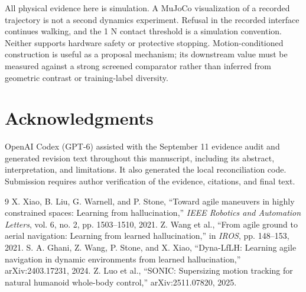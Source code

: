 \documentclass[letterpaper,10pt,conference]{ieeeconf}
\begin{document}
All physical evidence here is simulation. A MuJoCo visualization of a recorded
trajectory is not a second dynamics experiment. Refusal in the recorded interface
continues walking, and the 1 N contact threshold is a simulation convention.
Neither supports hardware safety or protective stopping. Motion-conditioned
construction is useful as a proposal mechanism; its downstream value must be
measured against a strong screened comparator rather than inferred from
geometric contrast or training-label diversity.

\section*{Acknowledgments}
OpenAI Codex (GPT-6) assisted with the September 11 evidence audit and generated
revision text throughout this manuscript, including its abstract, interpretation,
and limitations. It also generated the local reconciliation code. Submission
requires author verification of the evidence, citations, and final text.

\begin{thebibliography}{9}
 X. Xiao, B. Liu, G. Warnell, and P. Stone,
``Toward agile maneuvers in highly constrained spaces: Learning from hallucination,''
\emph{IEEE Robotics and Automation Letters}, vol. 6, no. 2, pp. 1503--1510, 2021.
 Z. Wang et al., ``From agile ground to aerial navigation:
Learning from learned hallucination,'' in \emph{IROS}, pp. 148--153, 2021.
 S. A. Ghani, Z. Wang, P. Stone, and X. Xiao,
``Dyna-LfLH: Learning agile navigation in dynamic environments from learned
hallucination,'' arXiv:2403.17231, 2024.
 Z. Luo et al., ``SONIC: Supersizing motion tracking for natural
humanoid whole-body control,'' arXiv:2511.07820, 2025.
\end{thebibliography}
\end{document}
